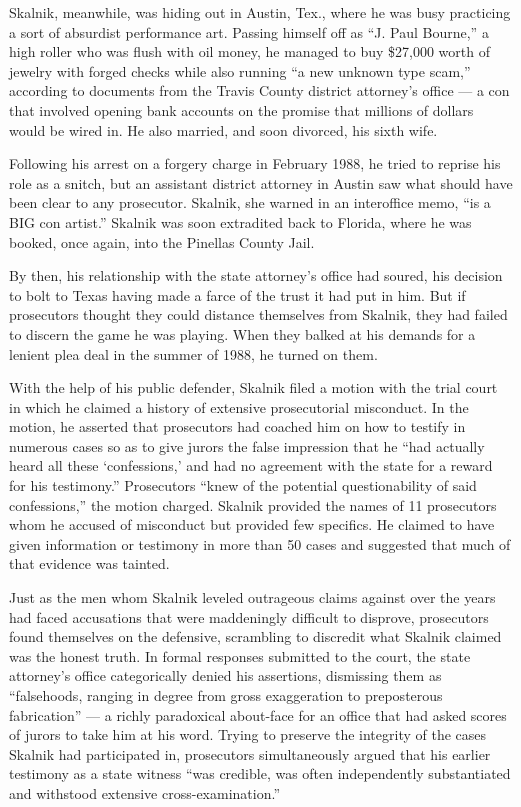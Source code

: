 Skalnik, meanwhile, was hiding out in Austin, Tex., where he was busy
practicing a sort of absurdist performance art. Passing himself off as
``J. Paul Bourne,'' a high roller who was flush with oil money, he
managed to buy \$27,000 worth of jewelry with forged checks while also
running ``a new unknown type scam,'' according to documents from the
Travis County district attorney's office --- a con that involved opening
bank accounts on the promise that millions of dollars would be wired in.
He also married, and soon divorced, his sixth wife.

Following his arrest on a forgery charge in February 1988, he tried to
reprise his role as a snitch, but an assistant district attorney in
Austin saw what should have been clear to any prosecutor. Skalnik, she
warned in an interoffice memo, ``is a BIG con artist.'' Skalnik was soon
extradited back to Florida, where he was booked, once again, into the
Pinellas County Jail.

By then, his relationship with the state attorney's office had soured,
his decision to bolt to Texas having made a farce of the trust it had
put in him. But if prosecutors thought they could distance themselves
from Skalnik, they had failed to discern the game he was playing. When
they balked at his demands for a lenient plea deal in the summer of
1988, he turned on them.

With the help of his public defender, Skalnik filed a motion with the
trial court in which he claimed a history of extensive prosecutorial
misconduct. In the motion, he asserted that prosecutors had coached him
on how to testify in numerous cases so as to give jurors the false
impression that he ``had actually heard all these `confessions,' and had
no agreement with the state for a reward for his testimony.''
Prosecutors ``knew of the potential questionability of said
confessions,'' the motion charged. Skalnik provided the names of 11
prosecutors whom he accused of misconduct but provided few specifics. He
claimed to have given information or testimony in more than 50 cases and
suggested that much of that evidence was tainted.

Just as the men whom Skalnik leveled outrageous claims against over the
years had faced accusations that were maddeningly difficult to disprove,
prosecutors found themselves on the defensive, scrambling to discredit
what Skalnik claimed was the honest truth. In formal responses submitted
to the court, the state attorney's office categorically denied his
assertions, dismissing them as ``falsehoods, ranging in degree from
gross exaggeration to preposterous fabrication'' --- a richly
paradoxical about-face for an office that had asked scores of jurors to
take him at his word. Trying to preserve the integrity of the cases
Skalnik had participated in, prosecutors simultaneously argued that his
earlier testimony as a state witness ``was credible, was often
independently substantiated and withstood extensive cross-examination.''

